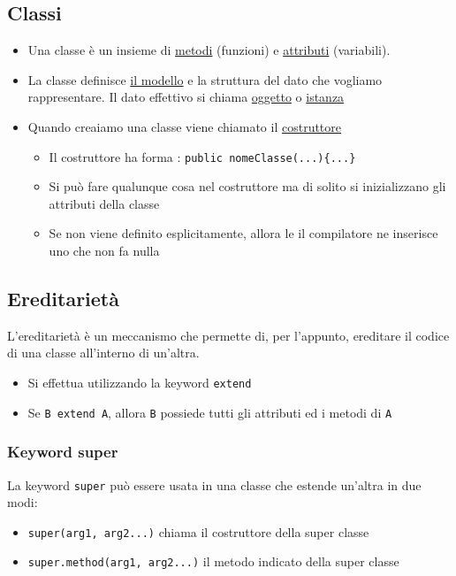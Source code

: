 \subsection{Classi}
\begin{itemize}
	\item Una classe è un insieme di \underline{metodi} (funzioni) e \underline{attributi} (variabili).
	\item La classe definisce \underline{il modello} e la struttura del dato che vogliamo rappresentare. Il dato effettivo si chiama \underline{oggetto} o \underline{istanza}
	\item Quando creaiamo una classe viene chiamato il \underline{costruttore}
	      \begin{itemize}
		      \item Il costruttore ha forma : \verb|public nomeClasse(...){...}|
		      \item Si può fare qualunque cosa nel costruttore ma di solito si inizializzano gli attributi della classe
		      \item Se non viene definito esplicitamente, allora le il compilatore ne inserisce uno che non fa nulla
	      \end{itemize}
\end{itemize}

\subsection{Ereditarietà}
L'ereditarietà è un meccanismo che permette di, per l'appunto, ereditare il codice di una classe all'interno di un'altra.
\begin{itemize}
	\item Si effettua utilizzando la keyword \verb|extend|
	\item Se \verb|B extend A|, allora \verb|B| possiede tutti gli attributi ed i metodi di \verb|A|
\end{itemize}
\subsubsection{Keyword super}
La keyword \verb|super| può essere usata in una classe che estende un'altra in due modi:
\begin{itemize}
	\item \verb|super(arg1, arg2...)| chiama il costruttore della super classe
	\item \verb|super.method(arg1, arg2...)| il metodo indicato della super classe
\end{itemize}
